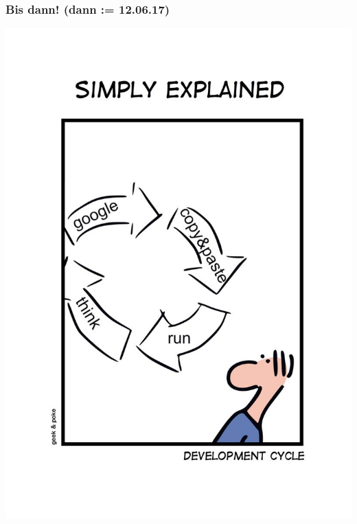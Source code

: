 \documentclass[18pt]{beamer}
\begin{document}
	\begin{frame}
		\frametitle{Bis dann! (dann := 12.06.17)}
		\centering
		\includegraphics[scale=0.9]{./comics/geek_and_poke_development.jpg}
	\end{frame}
\end{document}
